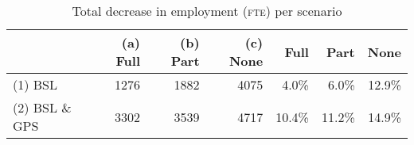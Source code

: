 \begin{table}[H]
\centering
\caption{\label{comjltotex}Total decrease in employment (\textsc{fte})  per scenario} 
\begin{tabular}{lrrr|rrr}
  \hline
 &  (a) Full & (b) Part & (c) None & Full & Part & None \\ 
  \hline
(1) BSL & 1276 & 1882 & 4075 & 4.0\% & 6.0\% & 12.9\% \\ 
  (2) BSL \& GPS & 3302 & 3539 & 4717 & 10.4\% & 11.2\% & 14.9\% \\ 
   \hline
\end{tabular}
\end{table}
